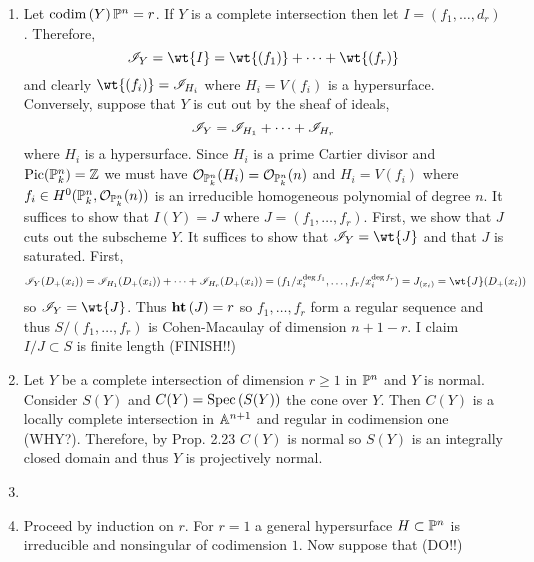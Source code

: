 \documentclass[12pt]{article}
\begin{document}
\begin{enumerate}
\item Let $\codim{Y}{\P^n} = r$. If $Y$ is a complete intersection then let $I = (f_1, \dots, d_r)$. Therefore, 
\[ \I_Y = \wt{I} = \wt{(f_1)} + \cdots + \wt{(f_r)} \]
and clearly $\wt{(f_i)} = \I_{H_i}$ where $H_i = V(f_i)$ is a hypersurface.
\bigskip\\
Conversely, suppose that $Y$ is cut out by the sheaf of ideals,
\[ \I_Y = \I_{H_1} + \cdots + \I_{H_r} \]
where $H_i$ is a hypersurface. Since $H_i$ is a prime Cartier divisor and $\Pic{\P^n_k} = \Z$ we must have $\struct{\P^n_k}(H_i) = \struct{\P^n_k}(n)$ and $H_i = V(f_i)$ where $f_i \in H^0(\P^n_k, \struct{\P^n_k}(n))$ is an irreducible homogeneous polynomial of degree $n$. It suffices to show that $I(Y) = J$ where $J = (f_1, \dots, f_r)$. First, we show that $J$ cuts out the subscheme $Y$. It suffices to show that $\I_Y = \wt{J}$ and that $J$ is saturated. First, 
\[ \I_Y(D_+(x_i)) = \I_{H_1}(D_+(x_i)) + \cdots + \I_{H_r}(D_+(x_i)) = (f_1/x_i^{\deg{f_1}}, \dots, f_r/x_i^{\deg{f_r}}) = J_{(x_i)} = \wt{J}(D_+(x_i)) \]
so $\I_Y = \wt{J}$. Thus $\height{J} = r$ so $f_1, \dots, f_r$ form a regular sequence and thus $S/(f_1, \dots, f_r)$ is Cohen-Macaulay of dimension $n + 1 - r$. I claim $I/J \subset S$ is finite length (FINISH!!)

\item Let $Y$ be a complete intersection of dimension $r \ge 1$ in $\P^n$ and $Y$ is normal. Consider $S(Y)$ and $C(Y) = \Spec{S(Y)}$ the cone over $Y$. Then $C(Y)$ is a locally complete intersection in $\A^{n+1}$ and regular in codimension one (WHY?). Therefore, by Prop. 2.23 $C(Y)$ is normal so $S(Y)$ is an integrally closed domain and thus $Y$ is projectively normal.

\item 

\item Proceed by induction on $r$. For $r = 1$ a general hypersurface $H \subset \P^n$ is irreducible and nonsingular of codimension $1$. Now suppose that (DO!!)


\end{enumerate}
\end{document}
